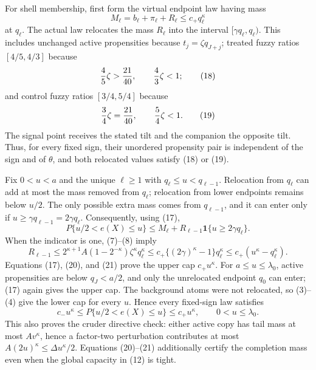 For shell membership, first form the virtual endpoint law having mass
\[
M_\ell=b_\ell+\pi_\ell+R_\ell\leq c_+q_\ell^\kappa                     \tag{17}
\]
at \(q_\ell\).  The actual law relocates the mass \(R_\ell\) into the interval \([\gamma q_\ell,q_\ell)\).  This includes unchanged active propensities because \(t_j=\zeta q_{J+j}\); treated fuzzy ratios \([4/5,4/3]\) because
\[
{4\over5}\zeta>{21\over40},\qquad {4\over3}\zeta<1;                   \tag{18}
\]
and control fuzzy ratios \([3/4,5/4]\) because
\[
{3\over4}\zeta={21\over40},\qquad {5\over4}\zeta<1.                   \tag{19}
\]
The signal point receives the stated tilt and the companion the opposite tilt.  Thus, for every fixed sign, their unordered propensity pair is independent of the sign and of \(\theta\), and both relocated values satisfy (18) or (19).

Fix \(0<u<a\) and the unique \(\ell\geq1\) with \(q_\ell\leq u<q_{\ell-1}\).  Relocation from \(q_\ell\) can add at most the mass removed from \(q_\ell\); relocation from lower endpoints remains below \(u/2\).  The only possible extra mass comes from \(q_{\ell-1}\), and it can enter only if \(u\geq\gamma q_{\ell-1}=2\gamma q_\ell\).  Consequently, using (17),
\[
P\{u/2<e(X)\leq u\}
\leq M_\ell+
R_{\ell-1}\mathbf 1\{u\geq2\gamma q_\ell\}.                            \tag{20}
\]
When the indicator is one, (7)--(8) imply
\[
R_{\ell-1}
\leq2^{\kappa+1}A(1-2^{-\kappa})\zeta^\kappa q_\ell^\kappa
\leq c_+\{(2\gamma)^\kappa-1\}q_\ell^\kappa
\leq c_+(u^\kappa-q_\ell^\kappa).                                      \tag{21}
\]
Equations (17), (20), and (21) prove the upper cap \(c_+u^\kappa\).  For \(a\leq u\leq\lambda_0\), active propensities are below \(q_J<a/2\), and only the unrelocated endpoint \(q_0\) can enter; (17) again gives the upper cap.  The background atoms were not relocated, so (3)--(4) give the lower cap for every \(u\).  Hence every fixed-sign law satisfies
\[
c_-u^\kappa\leq P\{u/2<e(X)\leq u\}\leq c_+u^\kappa,\qquad
0<u\leq\lambda_0.                                                       \tag{22}
\]
This also proves the cruder directive check: either active copy has tail mass at most \(Av^\kappa\), hence a factor-two perturbation contributes at most \(A(2u)^\kappa\leq\Delta u^\kappa/2\).  Equations (20)--(21) additionally certify the completion mass even when the global capacity in (12) is tight.

